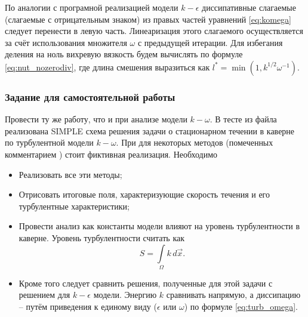 По аналогии с програмной реализацией модели $k-\epsilon$ диссипативные слагаемые (слагаемые с отрицательным знаком) из
правых частей уравнений \cref{eq:komega} следует перенести в левую часть. Линеаризация этого слагаемого осуществляется
за счёт использования множителя $\omega$ с предыдущей итерации.
Для избегания деления на ноль
вихревую вязкость будем вычислять по формуле \cref{eq:nut_nozerodiv},
где длина смешения выразиться как $l^* = \min(1, k ^{1/2} \omega^{-1})$.

\subsubsection{Задание для самостоятельной работы}
Провести ту же работу, что и при анализе модели $k-\omega$.
В тесте  из файла 
реализована SIMPLE схема решения задачи о стационарном течении в каверне
по турбулентной модели $k-\omega$.
При для некоторых методов (помеченных комментарием )
стоит фиктивная реализация.
Необходимо
\begin{itemize}
\item Реализовать все эти методы;
\item Отрисовать итоговые поля, характеризующие скорость течения и его турбулентные характеристики;
\item Провести анализ как константы модели влияют на уровень турбулентности в каверне. Уровень турбулентности
      считать как
\begin{equation*}
S = \int\limits_\Omega k \, d\vec x.
\end{equation*}
\item Кроме того следует сравнить решения, полученные для этой задачи
с решением для $k-\epsilon$ модели.
Энергию $k$ сравнивать напрямую,
а диссипацию -- путём приведения к единому виду ($\epsilon$ или $\omega$) 
по формуле \cref{eq:turb_omega}.
\end{itemize}
